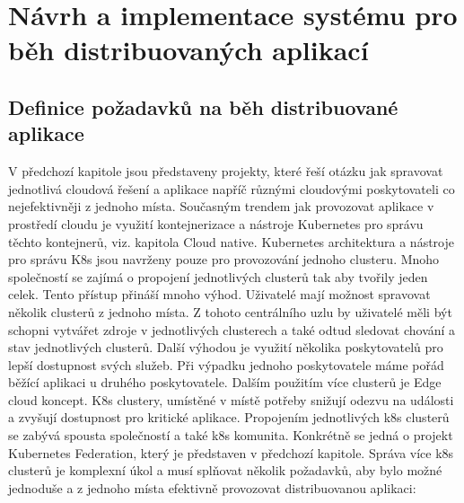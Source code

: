 \chapter{Návrh a implementace systému pro běh distribuovaných aplikací}
\section{Definice požadavků na běh distribuované aplikace}
V předchozí kapitole jsou představeny projekty, které řeší otázku jak spravovat jednotlivá cloudová řešení a aplikace napříč různými cloudovými poskytovateli co nejefektivněji z jednoho místa. Současným trendem jak provozovat aplikace v prostředí cloudu je využití kontejnerizace a nástroje Kubernetes pro správu těchto kontejnerů, viz. kapitola Cloud native. Kubernetes architektura a nástroje pro správu K8s jsou navrženy pouze pro provozování jednoho clusteru. Mnoho společností se zajímá o propojení jednotlivých clusterů tak aby tvořily jeden celek. Tento přístup přináší mnoho výhod. Uživatelé mají možnost spravovat několik clusterů z jednoho místa. Z tohoto centrálního uzlu by uživatelé měli být schopni vytvářet zdroje v jednotlivých clusterech a také odtud sledovat chování a stav jednotlivých clusterů. Další výhodou je využití několika poskytovatelů pro lepší dostupnost svých služeb. Při výpadku jednoho poskytovatele máme pořád běžící aplikaci u druhého poskytovatele. Dalším použitím více clusterů je Edge cloud koncept. K8s clustery, umístěné v místě potřeby snižují odezvu na události a zvyšují dostupnost pro kritické aplikace. Propojením jednotlivých k8s clusterů se zabývá spousta společností a také k8s komunita. Konkrétně se jedná o projekt Kubernetes Federation, který je představen v předchozí kapitole.
     Správa více k8s clusterů je komplexní úkol a musí splňovat několik požadavků, aby bylo možné jednoduše a z jednoho místa efektivně provozovat distribuovanou aplikaci: 
